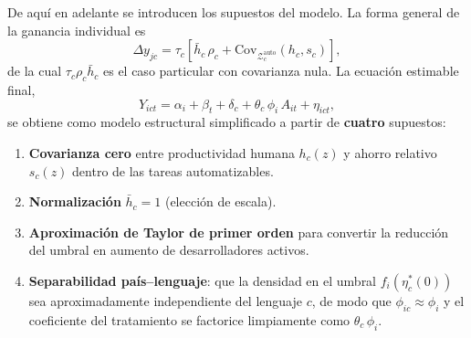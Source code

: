 \documentclass[11pt, a4paper]{article}
\begin{document}
De aqu\'i en adelante se introducen los supuestos del modelo. La forma general de la
ganancia individual es
\[
  \Delta y_{jc} = \tau_c\!\left[\bar{h}_c\,\rho_c + \mathrm{Cov}_{\mathcal{Z}^{\mathrm{auto}}_c}(h_c,s_c)\right],
\]
de la cual $\tau_c\rho_c\bar{h}_c$ es el caso particular con covarianza nula. La ecuaci\'on
estimable final,
\[
  Y_{ict} = \alpha_i + \beta_t + \delta_c + \theta_c\,\phi_i\,A_{it} + \eta_{ict},
\]
se obtiene como modelo estructural simplificado a partir de \textbf{cuatro} supuestos:
\begin{enumerate}[leftmargin=2em, itemsep=2pt]
  \item \textbf{Covarianza cero} entre productividad humana $h_c(z)$ y ahorro relativo $s_c(z)$
        dentro de las tareas automatizables.
  \item \textbf{Normalizaci\'on} $\bar{h}_c = 1$ (elecci\'on de escala).
  \item \textbf{Aproximaci\'on de Taylor de primer orden} para convertir la reducci\'on del umbral
        en aumento de desarrolladores activos.
  \item \textbf{Separabilidad pa\'is--lenguaje}: que la densidad en el umbral $f_i(\eta^*_c(0))$
        sea aproximadamente independiente del lenguaje $c$, de modo que $\phi_{ic}\approx\phi_i$
        y el coeficiente del tratamiento se factorice limpiamente como $\theta_c\,\phi_i$.
\end{enumerate}
\end{document}
